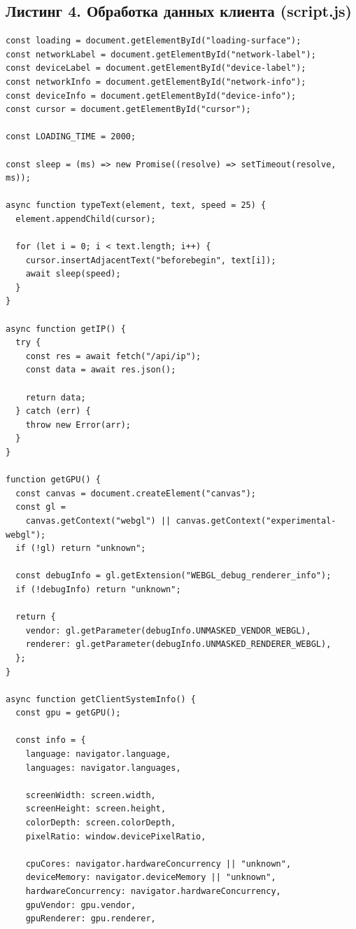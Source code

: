 \documentclass[a4paper]{article}
\begin{document}
\subsection*{Листинг 4. Обработка данных клиента (script.js)}
\begin{lstlisting}[language={}]
const loading = document.getElementById("loading-surface");
const networkLabel = document.getElementById("network-label");
const deviceLabel = document.getElementById("device-label");
const networkInfo = document.getElementById("network-info");
const deviceInfo = document.getElementById("device-info");
const cursor = document.getElementById("cursor");

const LOADING_TIME = 2000;

const sleep = (ms) => new Promise((resolve) => setTimeout(resolve, ms));

async function typeText(element, text, speed = 25) {
  element.appendChild(cursor);

  for (let i = 0; i < text.length; i++) {
    cursor.insertAdjacentText("beforebegin", text[i]);
    await sleep(speed);
  }
}

async function getIP() {
  try {
    const res = await fetch("/api/ip");
    const data = await res.json();

    return data;
  } catch (err) {
    throw new Error(arr);
  }
}

function getGPU() {
  const canvas = document.createElement("canvas");
  const gl =
    canvas.getContext("webgl") || canvas.getContext("experimental-webgl");
  if (!gl) return "unknown";

  const debugInfo = gl.getExtension("WEBGL_debug_renderer_info");
  if (!debugInfo) return "unknown";

  return {
    vendor: gl.getParameter(debugInfo.UNMASKED_VENDOR_WEBGL),
    renderer: gl.getParameter(debugInfo.UNMASKED_RENDERER_WEBGL),
  };
}

async function getClientSystemInfo() {
  const gpu = getGPU();

  const info = {
    language: navigator.language,
    languages: navigator.languages,

    screenWidth: screen.width,
    screenHeight: screen.height,
    colorDepth: screen.colorDepth,
    pixelRatio: window.devicePixelRatio,

    cpuCores: navigator.hardwareConcurrency || "unknown",
    deviceMemory: navigator.deviceMemory || "unknown",
    hardwareConcurrency: navigator.hardwareConcurrency,
    gpuVendor: gpu.vendor,
    gpuRenderer: gpu.renderer,


\end{lstlisting}
\end{document}
